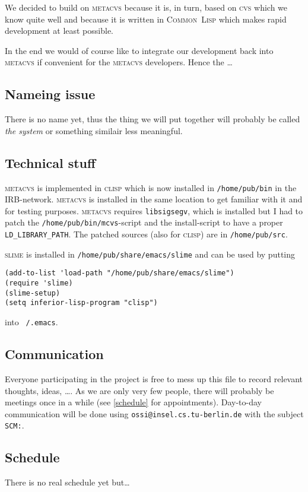 \documentclass[german, 10pt, a4paper]{article}
\begin{document}
We decided to build on \textsc{metacvs} because it is, in turn, based on
\textsc{cvs} which we know quite well and because it is written in
\textsc{Common~Lisp} which makes rapid development at least possible.

In the end we would of course like to integrate our development back
into \textsc{metacvs} if convenient for the \textsc{metacvs} developers.
Hence the \ldots

\subsection{Nameing issue}
There is no name yet, thus the thing we will put together will probably
be called \emph{the system} or something similair less meaningful.

\subsection{Technical stuff}
\textsc{metacvs} is implemented in \textsc{clisp} which is now installed
in \texttt{/home/pub/bin} in the IRB-network. \textsc{metacvs} is
installed in the same location to get familiar with it and for testing
purposes. \textsc{metacvs} requires \texttt{libsigsegv}, which is
installed but I had to patch the \texttt{/home/pub/bin/mcvs}-script and
the install-script to have a proper \texttt{LD\_LIBRARY\_PATH}. The
patched sources (also for \textsc{clisp}) are in \texttt{/home/pub/src}.

\textsc{slime} is installed in \texttt{/home/pub/share/emacs/slime} and
can be used by putting
\begin{verbatim}
(add-to-list 'load-path "/home/pub/share/emacs/slime")
(require 'slime)
(slime-setup)
(setq inferior-lisp-program "clisp")
\end{verbatim}

into \texttt{~/.emacs}.

\subsection{Communication}
Everyone participating in the project is free to mess up this file to
record relevant thoughts, ideas, \ldots.
As we are only very few people, there will probably be meetings once in
a while (see \ref{schedule} for appointments).
Day-to-day communication will be done using
\texttt{ossi@insel.cs.tu-berlin.de} with the subject \texttt{SCM:}.
\subsection{Schedule \label{schedule}}
There is no real schedule yet but\ldots
\end{document}
